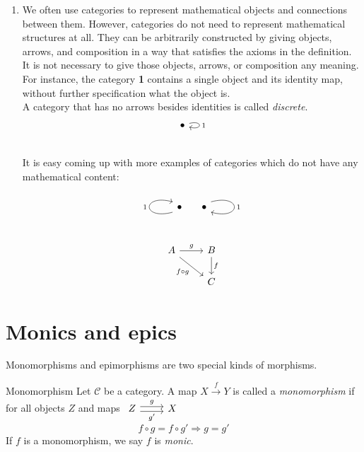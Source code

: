 \begin {enumerate}
  \item We often use categories to represent mathematical objects and connections between them.
    However, categories do not need to represent mathematical structures at all.
    They can be arbitrarily constructed by giving objects,
    arrows, and composition in a way that satisfies the axioms in the definition.
    It is not necessary to give those objects, arrows, or composition any meaning.
    For instance, the category \textbf{1} contains a single object and its identity map,
    without further specification what the object is.\\
    A category that has no arrows besides identities is called \emph{discrete}.\\
      \[
        \begin{tikzcd}
          \bullet \arrow[loop right, "1"]\\
        \end{tikzcd}
      \]
      It is easy coming up with more examples of categories which do not have any mathematical content:\\[3mm]
      \begin{minipage}{.5\linewidth}
        \[
          \begin{tikzcd}
            \bullet \arrow[loop left, "1"] \qquad \bullet \arrow[loop right, "1"]\\
          \end{tikzcd}
        \]
      \end{minipage}%
      \begin{minipage}{.5\linewidth}
        \[
          \begin{tikzcd}
            A \arrow{r}{g} \arrow[swap, dr, "f \circ g"] & B \arrow{d}{f} \\
            & C
          \end{tikzcd}
        \]
      \end{minipage}
    \end {enumerate}

    \newpage

\section {Monics and epics}

Monomorphisms and epimorphisms are two special kinds of morphisms.

\begin{definition}{Monomorphism}
  Let $\mathscr{C}$ be a category. A map $X \overset{f}{\to} Y$ is called a \emph{monomorphism} if for all objects $Z$ and maps
  $
  \begin{tikzcd}
    Z \arrow[r,shift left, "g"] \arrow[r,shift right,swap,"g'"] & X
  \end{tikzcd}
  $
  \[
    f \circ g = f \circ g' \Rightarrow g = g'
  \]
  If $f$ is a monomorphism, we say $f$ is \emph{monic}.
\end{definition}

